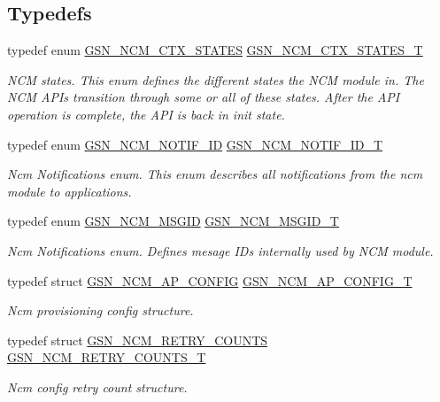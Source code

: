 \subsection*{Typedefs}
\begin{DoxyCompactItemize}
\item 
typedef enum \hyperlink{a00688_ga950af3c458482d4fbf1838aaf8b30f2d}{GSN\_\-NCM\_\-CTX\_\-STATES} \hyperlink{a00688_gaf5a85b17466f3a523dbf5643e72f628d}{GSN\_\-NCM\_\-CTX\_\-STATES\_\-T}
\begin{DoxyCompactList}\small\item\em NCM states. This enum defines the different states the NCM module in. The NCM APIs transition through some or all of these states. After the API operation is complete, the API is back in init state. \end{DoxyCompactList}\item 
typedef enum \hyperlink{a00688_ga9e3bfe0ed58e26633d51d10250743b2a}{GSN\_\-NCM\_\-NOTIF\_\-ID} \hyperlink{a00688_ga0be96257e7b0db4dd67006357eb5cec6}{GSN\_\-NCM\_\-NOTIF\_\-ID\_\-T}
\begin{DoxyCompactList}\small\item\em Ncm Notifications enum. This enum describes all notifications from the ncm module to applications. \end{DoxyCompactList}\item 
typedef enum \hyperlink{a00688_ga7df8ae3172682e89bfa663208e3f0081}{GSN\_\-NCM\_\-MSGID} \hyperlink{a00688_ga1df95350543744eb99d0ce7433e6db16}{GSN\_\-NCM\_\-MSGID\_\-T}
\begin{DoxyCompactList}\small\item\em Ncm Notifications enum. Defines mesage IDs internally used by NCM module. \end{DoxyCompactList}\item 
typedef struct \hyperlink{a00156}{GSN\_\-NCM\_\-AP\_\-CONFIG} \hyperlink{a00688_ga881c978ce73a5c4c2e6e9080d4a07879}{GSN\_\-NCM\_\-AP\_\-CONFIG\_\-T}
\begin{DoxyCompactList}\small\item\em Ncm provisioning config structure. \end{DoxyCompactList}\item 
typedef struct \hyperlink{a00161}{GSN\_\-NCM\_\-RETRY\_\-COUNTS} \hyperlink{a00688_gab0e77b5fbb8b18c829e3cd9170252340}{GSN\_\-NCM\_\-RETRY\_\-COUNTS\_\-T}
\begin{DoxyCompactList}\small\item\em Ncm config retry count structure. \end{DoxyCompactList}\item 

\end{DoxyCompactItemize}
